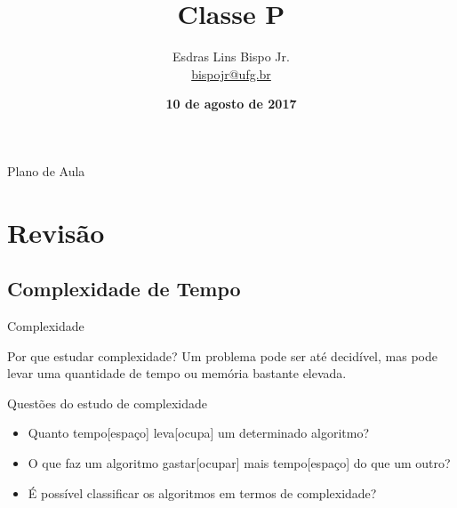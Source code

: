 \documentclass[xcolor=dvipsnames,table]{beamer}
\title{Classe P}
\author{
  Esdras Lins Bispo Jr. \\ \url{bispojr@ufg.br}
  }
\institute{
  Teoria da Computação \\Bacharelado em Ciência da Computação}
\date{\textbf{10 de agosto de 2017} }
\begin{document}
	\begin{frame}
		\titlepage
	\end{frame}

	\AtBeginSection{
		\begin{frame}{Sumário}%
    		\tableofcontents[currentsection]
		\end{frame}
	}

	\begin{frame}{Plano de Aula}
		\tableofcontents
	\end{frame}
    
    \section{Revisão}
	
	\subsection{Complexidade de Tempo}	
	\begin{frame}{Complexidade}
		\begin{block}{Por que estudar complexidade?}
			Um problema pode ser até decidível, mas pode levar uma quantidade de tempo ou memória bastante elevada.
		\end{block}   
		\begin{block}{Questões do estudo de complexidade}
			\begin{itemize}
				\item Quanto tempo[espaço] leva[ocupa] um determinado algoritmo?
				\item O que faz um algoritmo gastar[ocupar] mais tempo[espaço] do que um outro?
				\item É possível classificar os algoritmos em termos de complexidade?
			\end{itemize}
		\end{block}
	\end{frame}
	
\end{document}
